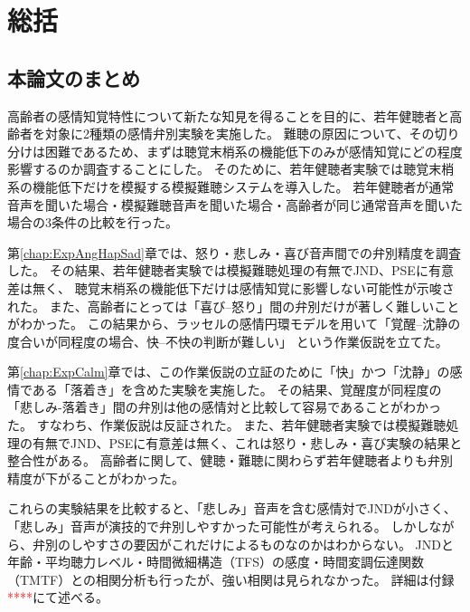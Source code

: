 \chapter{総括}
\section{本論文のまとめ}
\label{sec:Summary}
高齢者の感情知覚特性について新たな知見を得ることを目的に、若年健聴者と高齢者を対象に2種類の感情弁別実験を実施した。
難聴の原因について、その切り分けは困難であるため、まずは聴覚末梢系の機能低下のみが感情知覚にどの程度影響するのか調査することにした。
そのために、若年健聴者実験では聴覚末梢系の機能低下だけを模擬する模擬難聴システムを導入した。
若年健聴者が通常音声を聞いた場合・模擬難聴音声を聞いた場合・高齢者が同じ通常音声を聞いた場合の3条件の比較を行った。

第\ref{chap:ExpAngHapSad}章では、怒り・悲しみ・喜び音声間での弁別精度を調査した。
その結果、若年健聴者実験では模擬難聴処理の有無でJND、PSEに有意差は無く、
聴覚末梢系の機能低下だけは感情知覚に影響しない可能性が示唆された。
また、高齢者にとっては「喜び–怒り」間の弁別だけが著しく難しいことがわかった。
この結果から、ラッセルの感情円環モデルを用いて「覚醒–沈静の度合いが同程度の場合、快–不快の判断が難しい」
という作業仮説を立てた。

第\ref{chap:ExpCalm}章では、この作業仮説の立証のために「快」かつ「沈静」の感情である「落着き」を含めた実験を実施した。
その結果、覚醒度が同程度の「悲しみ-落着き」間の弁別は他の感情対と比較して容易であることがわかった。
すなわち、作業仮説は反証された。
また、若年健聴者実験では模擬難聴処理の有無でJND、PSEに有意差は無く、これは怒り・悲しみ・喜び実験の結果と整合性がある。
高齢者に関して、健聴・難聴に関わらず若年健聴者よりも弁別精度が下がることがわかった。

これらの実験結果を比較すると、「悲しみ」音声を含む感情対でJNDが小さく、「悲しみ」音声が演技的で弁別しやすかった可能性が考えられる。
しかしながら、弁別のしやすさの要因がこれだけによるものなのかはわからない。
JNDと年齢・平均聴力レベル・時間微細構造（TFS）の感度・時間変調伝達関数（TMTF）との相関分析も行ったが、強い相関は見られなかった。
詳細は付録\textcolor{red}{****}にて述べる。



